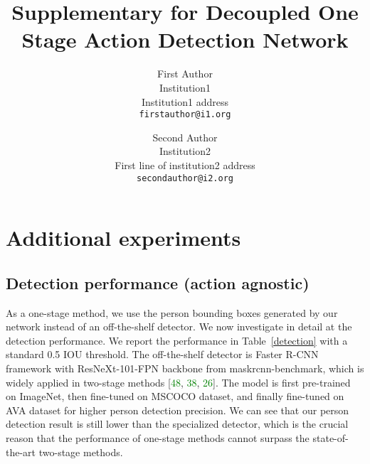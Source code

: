 \documentclass[review]{cvpr}
\begin{document}
\title{Supplementary for Decoupled One Stage Action Detection Network}

\author{First Author\\
Institution1\\
Institution1 address\\
{\tt\small firstauthor@i1.org}
\and
Second Author\\
Institution2\\
First line of institution2 address\\
{\tt\small secondauthor@i2.org}
}

\maketitle


\section{Additional experiments}

\subsection{Detection performance (action agnostic)}
As a one-stage method, we use the person bounding boxes generated by our network instead of an off-the-shelf detector. We now investigate in detail at the detection performance. We report the performance in Table~\ref{detection} with a standard 0.5 IOU threshold. The off-the-shelf detector is Faster R-CNN framework with ResNeXt-101-FPN backbone from maskrcnn-benchmark, which is widely applied in two-stage methods [\textcolor{green}{48}, \textcolor{green}{38}, \textcolor{green}{26}]. The model is first pre-trained on ImageNet, then fine-tuned on MSCOCO dataset, and finally fine-tuned on AVA dataset for higher person detection precision. We can see that our person detection result is still lower than the specialized detector, which is the crucial reason that the performance of one-stage methods cannot surpass the state-of-the-art two-stage methods.
\end{document}
